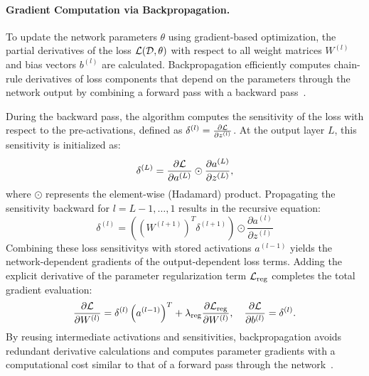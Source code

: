 \paragraph{Gradient Computation via Backpropagation.}
To update the network parameters $\theta$ using gradient-based optimization, 
the partial derivatives of the loss $\mathcal{L}(\mathcal{D}, \theta)$ with respect 
to all weight matrices $W^{(l)}$ and bias vectors $b^{(l)}$ are calculated. 
Backpropagation efficiently computes chain-rule derivatives of loss components that depend on
the parameters through the network output by combining a forward pass  
with a backward pass~.

During the backward pass, the algorithm computes the sensitivity of the loss with respect to the pre-activations, 
defined as $\delta^{(l)} = \frac{\partial \mathcal{L}}{\partial z^{(l)}}$. 
At the output layer $L$, this sensitivity is initialized as:
\begin{equation}
    \delta^{(L)} = \frac{\partial \mathcal{L}}{\partial a^{(L)}} \odot \frac{\partial a^{(L)}}{\partial z^{(L)}},
\end{equation}
where $\odot$ represents the element-wise (Hadamard) product. 
Propagating the sensitivity backward for $l = L-1, \dots, 1$ results in the recursive equation:
\begin{equation}
    \label{eq:backprop-recursive-fraction}
    \delta^{(l)} = \left( (W^{(l+1)})^T \delta^{(l+1)} \right) \odot \frac{\partial a^{(l)}}{\partial z^{(l)}}
\end{equation}
Combining these loss sensitivitys with stored activations $a^{(l-1)}$ yields the network-dependent gradients 
of the output-dependent loss terms. Adding the explicit derivative of the parameter regularization term 
$\mathcal{L}_{\mathrm{reg}}$ completes the total gradient evaluation:
\begin{equation}
    \frac{\partial \mathcal{L}}{\partial W^{(l)}} = \delta^{(l)} \left(a^{(l-1)}\right)^T + 
        \lambda_{\mathrm{reg}} \frac{\partial \mathcal{L}_{\mathrm{reg}}}{\partial W^{(l)}}, \quad 
    \frac{\partial \mathcal{L}}{\partial b^{(l)}} = \delta^{(l)}.
\end{equation}
By reusing intermediate activations and sensitivities, backpropagation avoids redundant derivative 
calculations and computes parameter gradients with a computational cost similar to that of a forward pass
through the network~.


